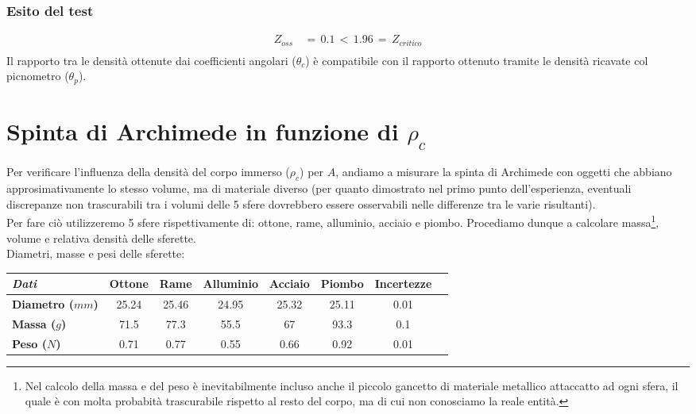 \documentclass{article}
\begin{document}
\subsubsection*{Esito del test}
\begin{equation*}
\begin{split}
    Z_{oss} \,&= \,0.1 \,< \,1.96 \,= \,Z_{critico} \\[0.2cm]
\end{split}
\end{equation*}
Il rapporto tra le densità ottenute dai coefficienti angolari ($\theta_c$) è compatibile con il rapporto ottenuto tramite le densità ricavate col picnometro ($\theta_p$). 


\section{Spinta di Archimede in funzione di $\rho_c$}
Per verificare l’influenza della densità del corpo immerso ($\rho_c$) per $A$, andiamo a misurare la spinta di Archimede con oggetti che abbiano approsimativamente lo stesso volume, ma di materiale diverso (per quanto dimostrato nel primo punto dell'esperienza, eventuali discrepanze non trascurabili tra i volumi delle 5 sfere dovrebbero essere osservabili nelle differenze tra le varie risultanti).\\
Per fare ciò utilizzeremo 5 sfere rispettivamente di: ottone, rame, alluminio, acciaio e piombo. 
Procediamo dunque a calcolare massa\footnote{Nel calcolo della massa e del peso è inevitabilmente incluso anche il piccolo gancetto di materiale  metallico attaccatto ad ogni sfera, il quale è con molta probabità trascurabile rispetto al resto del corpo, ma di cui non conosciamo la reale entità.}, volume e relativa densità delle sferette. \medskip
\\Diametri, masse e pesi delle sferette: 

\begin{table}[!ht]
\centering
\begin{tabular}{lccccccc}
    \toprule
    \textit{Dati} &\textbf{Ottone} &\textbf{Rame} &\textbf{Alluminio} &\textbf{Acciaio} &\textbf{Piombo} &\textbf{Incertezze } \\
    \midrule
    \textbf{Diametro ($mm$)} &25.24 &25.46 &24.95 &25.32 &25.11 &0.01 \\
    \midrule
    \textbf{Massa ($g$)} &71.5 &77.3 &55.5 &67 &93.3 &0.1 \\
    \midrule
    \textbf{Peso ($N$)} &0.71 &0.77 &0.55 &0.66 &0.92 &0.01 \\
    \bottomrule
\end{tabular}
\end{table}
\end{document}

